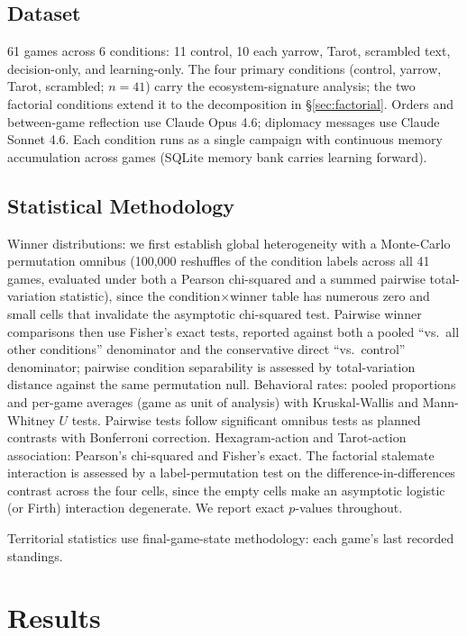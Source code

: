 \documentclass[11pt]{article}
\begin{document}
\subsection{Dataset}

61 games across 6 conditions: 11 control, 10 each yarrow, Tarot, scrambled text, decision-only, and learning-only. The four primary conditions (control, yarrow, Tarot, scrambled; $n=41$) carry the ecosystem-signature analysis; the two factorial conditions extend it to the decomposition in \S\ref{sec:factorial}. Orders and between-game reflection use Claude Opus 4.6; diplomacy messages use Claude Sonnet 4.6. Each condition runs as a single campaign with continuous memory accumulation across games (SQLite memory bank carries learning forward).

\subsection{Statistical Methodology}

Winner distributions: we first establish global heterogeneity with a Monte-Carlo permutation omnibus (100{,}000 reshuffles of the condition labels across all 41 games, evaluated under both a Pearson chi-squared and a summed pairwise total-variation statistic), since the condition$\times$winner table has numerous zero and small cells that invalidate the asymptotic chi-squared test. Pairwise winner comparisons then use Fisher's exact tests, reported against both a pooled ``vs.\ all other conditions'' denominator and the conservative direct ``vs.\ control'' denominator; pairwise condition separability is assessed by total-variation distance against the same permutation null. Behavioral rates: pooled proportions and per-game averages (game as unit of analysis) with Kruskal-Wallis and Mann-Whitney $U$ tests. Pairwise tests follow significant omnibus tests as planned contrasts with Bonferroni correction. Hexagram-action and Tarot-action association: Pearson's chi-squared and Fisher's exact. The factorial stalemate interaction is assessed by a label-permutation test on the difference-in-differences contrast across the four cells, since the empty cells make an asymptotic logistic (or Firth) interaction degenerate. We report exact $p$-values throughout.

Territorial statistics use final-game-state methodology: each game's last recorded standings.


\section{Results}
\label{sec:results}
\end{document}
